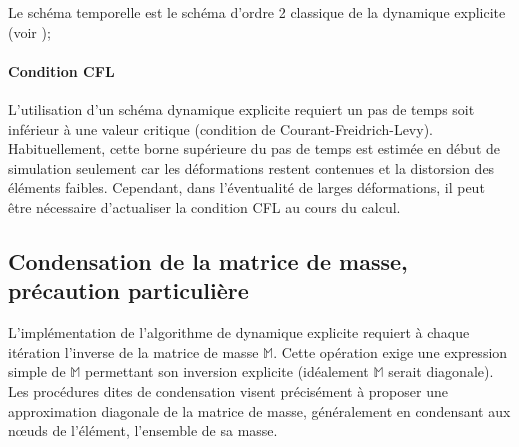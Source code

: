 \documentclass[10pt]{book}
\newcommand{\MatMass}{\mathbb{M}}
\begin{document}
Le schéma temporelle est le schéma d'ordre 2 classique de la dynamique explicite (voir \cite{bonnet2007analyse});
\paragraph{Condition CFL} L'utilisation d'un schéma dynamique explicite requiert un pas de temps soit inférieur à une valeur critique (condition de Courant-Freidrich-Levy). Habituellement, cette borne supérieure du pas de temps est estimée en début de simulation seulement car les déformations restent contenues et la distorsion des éléments faibles. Cependant, dans l'éventualité de larges déformations, il peut être nécessaire d’actualiser la condition CFL au cours du calcul. 
\subsection{Condensation de la matrice de masse, précaution particulière}
L'implémentation de l'algorithme de dynamique explicite requiert à chaque itération l'inverse de la matrice de masse $\MatMass$. Cette opération exige une expression simple de $\MatMass$ permettant son inversion explicite (idéalement $\MatMass$ serait diagonale). Les procédures dites \og de condensation \fg{} visent précisément à proposer une approximation diagonale de la matrice de masse, généralement en \og condensant \fg{} aux nœuds de l’élément, l'ensemble de sa masse.\\
\end{document}
